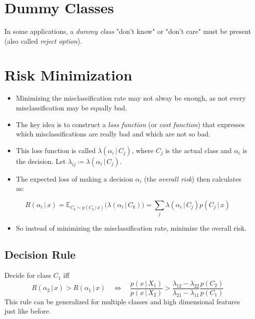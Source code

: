 \documentclass[a4paper, 11pt, accentcolor = tud3b]{tudreport}
\newcommand{\E}{\ensuremath{\mathbb{E}}}
\newcommand{\given}{\ensuremath{\,\vert\,}}
\begin{document}
		\section{Dummy Classes}
			In some applications, a \emph{dummy class} "don't know" or "don't care" must be present (also called \emph{reject option}).

		\section{Risk Minimization}
			\begin{itemize}
				\item Minimizing the misclassification rate may not alway be enough, as not every misclassification may be equally bad.
				\item The key idea is to construct a \emph{loss function} (or \emph{cost function}) that expresses which misclassifications are really bad and which are not so bad.
				\item This loss function is called \( \lambda(\alpha_i \given C_j) \), where \(C_j\) is the actual class and \(\alpha_i\) is the decision. Let \( \lambda_{ij} \coloneqq \lambda(\alpha_i \given C_j) \).
				\item The expected loss of making a decision \(\alpha_i\) (the \emph{overall risk}) then calculates as:
			\end{itemize}
			\begin{equation}
				R(\alpha_i \given x) = \E_{C_k \sim p(C_k \given x)} \big(\lambda(\alpha_i \given C_k)\big) = \sum_j \lambda(\alpha_i \given C_j) p(C_j \given x)
			\end{equation}
			\begin{itemize}
				\item So instead of minimizing the misclassification rate, minimize the overall risk.
			\end{itemize}

			\subsection{Decision Rule}
				Decide for class \(C_1\) iff
				\begin{equation}
					R(\alpha_2 \given x) > R(\alpha_1 \given x) \quad\iff\quad \frac{p(x \given X_1)}{p(x \given X_2)} > \frac{\lambda_{12} - \lambda_{22}}{\lambda_{21} - \lambda_{11}} \frac{p(C_2)}{p(C_1)}
				\end{equation}
				This rule can be generalized for multiple classes and high dimensional features just like before.
\end{document}
